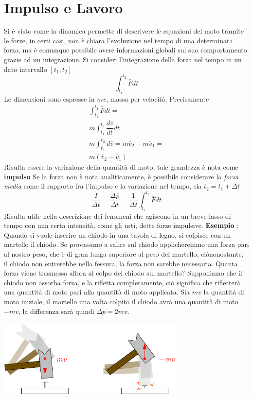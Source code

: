 \documentclass[10pt, letterpaper]{report}
\begin{document}
\section{Impulso e Lavoro}
Si è visto come la dinamica permette di descrivere le equazioni 
del moto tramite le forze, in certi casi, non è chiara l'evoluzione 
nel tempo di una determinata forza, ma è comunque possibile 
avere informazioni globali sul suo comportamento grazie ad un
 integrazione. Si consideri l'integrazione della forza nel tempo in un dato 
 intervallo $[t_1,t_2]$
 $$ \int_{t_1}^{t_2}\bar F dt$$
 Le dimensioni sono espresse in $mv$, massa per velocità. Precisamente 
\begin{eqnarray}
    \int_{t_1}^{t_2}\bar Fdt =\\ 
    m\int_{t_1}^{t_2} \dfrac{d\bar v}{dt}dt =\\ 
    m\int_{ \bar v_1}^{ \bar v_2}d\bar v = m\bar v_2-m\bar v_1=\\
    m( \bar v_2-\bar v_1)
\end{eqnarray}
Risulta essere la variazione della quantità di moto, tale grandezza 
è nota come \textbf{impulso}
Se la forza non è nota analiticamente, è possibile 
considerare la \textit{forza media} come il rapporto fra l'impulso 
e la variazione nel tempo, sia $t_2=t_1+\Delta t$
$$ \frac{I}{\Delta t}=\frac{\Delta \bar p}{\Delta t}
=\frac{1}{\Delta t}\int_{t_1}^{t_2}\bar F dt$$
Risulta utile nella descrizione dei fenomeni che agiscono in 
un breve lasso di tempo con una certa intensità, come gli urti, dette 
forze impulsive.\acc 
\textbf{Esempio} : Quando si vuole inserire un chiodo in una tavola di legno, si colpisce 
con un martello il chiodo. Se provassimo a salire sul chiodo applicheremmo una forza pari al nostro peso, che è 
di gran lunga superiore al peso del martello, ciònonostante, il chiodo non entrerebbe nella fessura, la forza non sarebbe 
necessaria.\acc 
Quanta forza viene trasmessa allora al colpo del chiodo sul martello? Supponiamo che il chiodo non assorba 
forza, e la rifletta completamente, ciò significa che rifletterà una quantità di moto pari alla quantità 
di moto applicata. Sia $mv$ la quantità di moto iniziale, il martello una volta colpito il chiodo avrà una 
quantità di moto $-mv$, la differenza sarà quindi $\Delta p=2mv$.\begin{center}
    \includegraphics[width=0.7\textwidth]{images/chiodo.pdf} 
\end{center}
\end{document}
